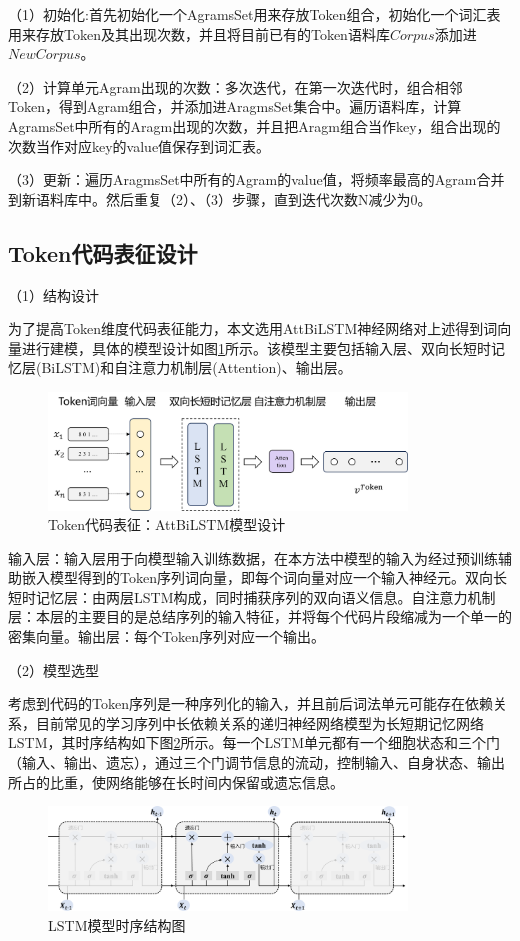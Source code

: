 （1）初始化:首先初始化一个AgramsSet用来存放Token组合，初始化一个词汇表用来存放Token及其出现次数，并且将目前已有的Token语料库$Corpus$添加进$NewCorpus$。

（2）计算单元Agram出现的次数：多次迭代，在第一次迭代时，组合相邻Token，得到Agram组合，并添加进AragmsSet集合中。遍历语料库，计算AgramsSet中所有的Aragm出现的次数，并且把Aragm组合当作key，组合出现的次数当作对应key的value值保存到词汇表。

（3）更新：遍历AragmsSet中所有的Agram的value值，将频率最高的Agram合并到新语料库中。然后重复（2）、（3）步骤，直到迭代次数N减少为0。

\subsection{Token代码表征设计}
\label{subsec:Token}
（1）结构设计

为了提高Token维度代码表征能力，本文选用AttBiLSTM神经网络对上述得到词向量进行建模，具体的模型设计如图\ref{fig:tokenmodel}所示。该模型主要包括输入层、双向长短时记忆层(BiLSTM)和自注意力机制层(Attention)、输出层。
\begin{figure}[H]
  \centering
  \includegraphics[width=0.85\textwidth]{figures/tokenmodel}
  \caption{Token代码表征：AttBiLSTM模型设计}\label{fig:tokenmodel}
\end{figure}

输入层：输入层用于向模型输入训练数据，在本方法中模型的输入为经过预训练辅助嵌入模型得到的Token序列词向量，即每个词向量对应一个输入神经元。双向长短时记忆层：由两层LSTM构成，同时捕获序列的双向语义信息。自注意力机制层：本层的主要目的是总结序列的输入特征，并将每个代码片段缩减为一个单一的密集向量。输出层：每个Token序列对应一个输出。

（2）模型选型

考虑到代码的Token序列是一种序列化的输入，并且前后词法单元可能存在依赖关系，目前常见的学习序列中长依赖关系的递归神经网络模型为长短期记忆网络LSTM，其时序结构如下图\ref{fig:LSTM}所示。每一个LSTM单元都有一个细胞状态和三个门（输入、输出、遗忘），通过三个门调节信息的流动，控制输入、自身状态、输出所占的比重，使网络能够在长时间内保留或遗忘信息。
\begin{figure}[H]
  \centering
  \includegraphics[width=0.85\textwidth]{figures/LSTM}
  \caption{LSTM模型时序结构图}\label{fig:LSTM}
\end{figure}

